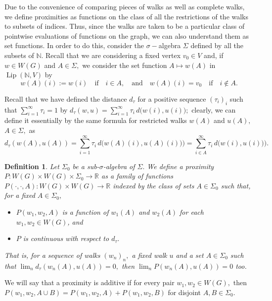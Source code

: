 \documentclass[preprint,12pt]{elsarticle}
\newtheorem{definition}[theorem]{Definition}
\begin{document}

Due to the convenience of comparing pieces of walks as well as complete walks, we define proximities as functions on the class of all the restrictions of the walks to subsets of indices.
Thus,  since the walks are taken to be a particular class of pointwise evaluations of functions on the graph, we can also understand them as set functions. In order to do this,
consider the $\sigma-$algebra $\Sigma$ defined by all the subsets of $\mathbb N.$ Recall that we are considering a fixed vertex $v_0 \in V$ and, if $w \in W(G)$ and $A \in \Sigma,$ we consider the set function $A \mapsto w(A)$ in $\operatorname{Lip}(\mathbb N, V)$ by
$$
w(A)(i) := w(i) \quad \text{if} \quad i \in A, \quad \text{and} \quad
w(A)(i)= v_0 \quad \text{if} \quad i \notin A.
$$

Recall that we have defined the distance $d_\tau$ for a positive sequence $(\tau_i)_i$ such that $\sum_{i=1}^\infty\tau_i=1$ by
$d_\tau(w,u)= \sum_{i=1}^\infty \tau_i \, d \big( w(i),u(i) \big);$ clearly, we can define it essentially by the same formula for restricted walks $w(A)$ and $u(A),$ $A \in \Sigma,$ as
$$
d_\tau(w(A),u(A))= \sum_{i=1}^\infty \tau_i \, d \big( w(A)(i),u(A)(i)) \big)
=\sum_{i \in A}^\infty \tau_i \, d \big( w(i),u(i)) \big).
$$ 

\begin{definition}
Let $\Sigma_0$ be a sub-$\sigma$-algebra of $\Sigma.$
We define a proximity $P: W(G) \times W(G) \times \Sigma_0 \to \mathbb R$ as a family of functions $P(\cdot,\cdot,A): W(G) \times W(G) \to \mathbb R$  indexed by the class of sets $A \in \Sigma_0$ such that, for a fixed $A \in \Sigma_0,$
\begin{itemize}
    \item[(i)]
$P(w_1,w_2,A)$ is a function of $w_1(A)$ and $w_2(A)$ for each $w_1,w_2 \in W(G)$, and
\item[(ii)] $P$ is continuous with respect to $d_\tau.$
    
\end{itemize}
That is, for a sequence of walks $(w_n)_n,$ a fixed walk $u$ and a set $A \in \Sigma_0$ such that $\lim_n d_\tau(w_n(A),u(A))=0,$
then $\lim_n P(w_n(A),u(A))=0$ too. 
\end{definition}


We will say that a proximity is additive if for every pair $w_1,w_2\in W(G),$ then $P(w_1,w_2, A \cup B)= P(w_1,w_2,A)+ P(w_1,w_2,B)$ for disjoint $A,B \in \Sigma_0.$
\end{document}

